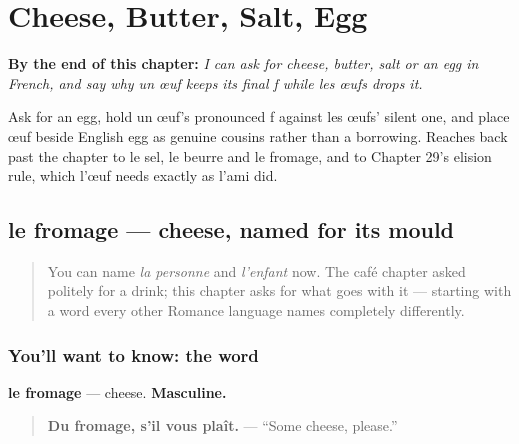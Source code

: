 
\chapter{Cheese, Butter, Salt, Egg}
\label{ch:fr-cheese-butter-salt-egg}

\begin{chapteropening}
\textbf{By the end of this chapter:} \emph{I can ask for cheese, butter, salt or an egg in French, and say why un œuf keeps its final f while les œufs drops it.}

Ask for an egg, hold un œuf's pronounced f against les œufs' silent one, and place œuf beside English egg as genuine cousins rather than a borrowing. Reaches back past the chapter to le sel, le beurre and le fromage, and to Chapter 29's elision rule, which l'œuf needs exactly as l'ami did.
\end{chapteropening}

\section[le fromage]{le fromage — cheese, named for its mould}

\label{lesson:FR-C30-fromage}



\begin{quote}
You can name \emph{la personne} and \emph{l'enfant} now. The café chapter asked politely for a drink; this chapter asks for what goes with it — starting with a word every other Romance language names completely differently.
\end{quote}

\subsection*{You'll want to know: the word}
\textbf{le fromage} — cheese. \textbf{Masculine.}

\begin{quote}
\textbf{Du fromage, s'il vous plaît.} — \textquotedblleft{}Some cheese, please.\textquotedblright{}
\end{quote}

